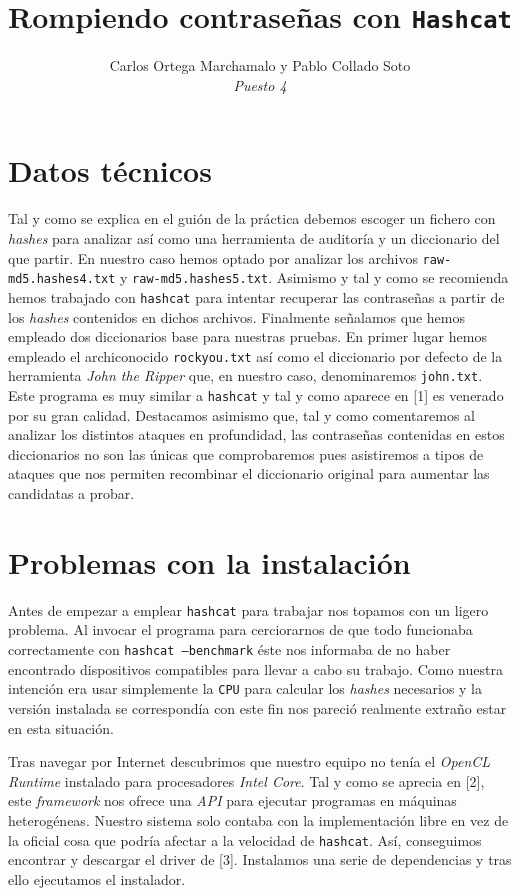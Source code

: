 \documentclass{article}
\title{Rompiendo contraseñas con \texttt{Hashcat}}
\author{Carlos Ortega Marchamalo y Pablo Collado Soto \\ \textit{Puesto 4}}
\date{}
\begin{document}
    \maketitle

    \section{Datos técnicos}
        Tal y como se explica en el guión de la práctica debemos escoger un fichero con \textit{hashes} para analizar así como una herramienta de auditoría y un diccionario del que partir. En nuestro caso hemos optado por analizar los archivos \texttt{raw-md5.hashes4.txt} y \texttt{raw-md5.hashes5.txt}. Asimismo y tal y como se recomienda hemos trabajado con \texttt{hashcat} para intentar recuperar las contraseñas a partir de los \textit{hashes} contenidos en dichos archivos. Finalmente señalamos que hemos empleado dos diccionarios base para nuestras pruebas. En primer lugar hemos empleado el archiconocido \texttt{rockyou.txt} así como el diccionario por defecto de la herramienta \textit{John the Ripper} que, en nuestro caso, denominaremos \texttt{john.txt}. Este programa es muy similar a \texttt{hashcat} y tal y como aparece en [1] es venerado por su gran calidad. Destacamos asimismo que, tal y como comentaremos al analizar los distintos ataques en profundidad, las contraseñas contenidas en estos diccionarios no son las únicas que comprobaremos pues asistiremos a tipos de ataques que nos permiten recombinar el diccionario original para aumentar las candidatas a probar.

    \section{Problemas con la instalación}
        Antes de empezar a emplear \texttt{hashcat} para trabajar nos topamos con un ligero problema. Al invocar el programa para cerciorarnos de que todo funcionaba correctamente con \texttt{hashcat --benchmark} éste nos informaba de no haber encontrado dispositivos compatibles para llevar a cabo su trabajo. Como nuestra intención era usar simplemente la \texttt{CPU} para calcular los \textit{hashes} necesarios y la versión instalada se correspondía con este fin nos pareció realmente extraño estar en esta situación.

        Tras navegar por Internet descubrimos que nuestro equipo no tenía el \textit{OpenCL Runtime} instalado para procesadores \textit{Intel Core}. Tal y como se aprecia en [2], este \textit{framework} nos ofrece una \textit{API} para ejecutar programas en máquinas heterogéneas. Nuestro sistema solo contaba con la implementación libre en vez de la oficial cosa que podría afectar a la velocidad de \texttt{hashcat}. Así, conseguimos encontrar y descargar el driver de [3]. Instalamos una serie de dependencias y tras ello ejecutamos el instalador.
\end{document}
